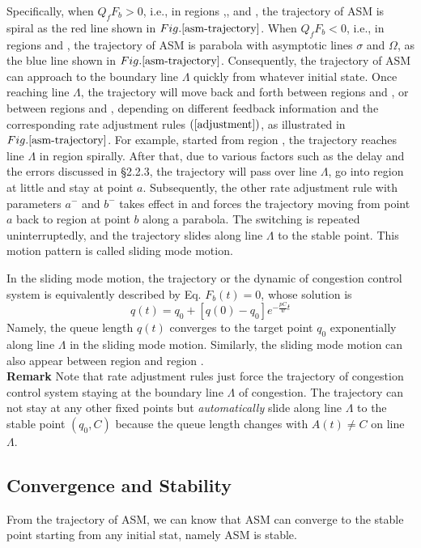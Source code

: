\documentclass{sig-alternate-10pt}
\def\figurename{Fig.}
\begin{document}
Specifically, when  $Q_fF_b>0$, i.e., in regions ,, and , the trajectory of ASM is spiral as the red line shown in $\figurename{\ref{asm-trajectory}}$. When $Q_fF_b<0$, i.e., in regions  and , the trajectory of ASM is parabola with asymptotic lines $\sigma$ and $\Omega$, as the blue line shown in $\figurename{\ref{asm-trajectory}}$. Consequently, the trajectory of ASM can approach to the boundary line $\Lambda$ quickly from whatever initial state. Once reaching line $\Lambda$, the trajectory will move back and forth between regions  and , or between regions  and , depending on different feedback information and the corresponding rate adjustment rules $(\ref{adjustment})$, as illustrated in $\figurename{\ref{asm-trajectory}}$. For example, started from region , the trajectory reaches line $\Lambda$ in region  spirally. After that, due to various factors such as the delay and the errors discussed in \S2.2.3, the trajectory will pass over line $\Lambda$, go into region  at little and stay at point $a$. Subsequently, the other rate adjustment rule with parameters $a^-$ and $b^-$ takes effect in  and forces the trajectory moving from point $a$ back to region  at point $b$ along a parabola. The switching is repeated uninterruptedly, and the trajectory slides along line $\Lambda$ to the stable point. This motion pattern is called sliding mode motion.

In the sliding mode motion, the trajectory or the dynamic of congestion control system is equivalently described by Eq. $F_b(t)=0$, whose solution is 
\begin{equation}
q(t)=q_0+[q(0)-q_0]e^{-\frac{pC}{w}t}
\label{smm-queue}
\end{equation}
Namely, the queue length $q(t)$ converges to the target point $q_0$ exponentially along line $\Lambda$ in the sliding mode motion. Similarly, the sliding mode motion can also appear between region  and region . \\
\textbf{Remark} Note that rate adjustment rules just force the trajectory of congestion control system staying at the boundary line $\Lambda$ of congestion. The trajectory can not stay at any other fixed points but \textit{automatically} slide along line $\Lambda$ to the stable point $(q_0, C)$ because the queue length changes with $A(t)\neq C$ on line $\Lambda$.


\subsection{Convergence and Stability}
From the trajectory of ASM, we can know that ASM can converge to the stable point starting from any initial stat, namely ASM is stable. 
\end{document}
